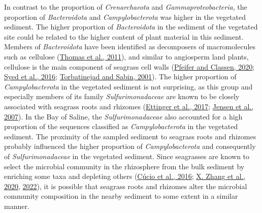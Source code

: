 \documentclass[
  12 pt,
]{book}
\begin{document}
In contrast to the proportion of \emph{Crenarchaeota} and \emph{Gammaproteobacteria}, the proportion of \emph{Bacteroidota} and \emph{Campylobacterota} was higher in the vegetated sediment. The higher proportion of \emph{Bacteroidota} in the sediment of the vegetated site could be related to the higher content of plant material in this sediment. Members of \emph{Bacteroidota} have been identified as decomposers of macromolecules such as cellulose (\protect\hyperlink{ref-Thomas2011}{Thomas et al., 2011}), and similar to angiosperm land plants, cellulose is the main component of seagrass cell walls (\protect\hyperlink{ref-Pfeifer2020}{Pfeifer and Classen, 2020}; \protect\hyperlink{ref-Syed2016}{Syed et al., 2016}; \protect\hyperlink{ref-Torbatinejad2001}{Torbatinejad and Sabin, 2001}). The higher proportion of \emph{Campylobacterota} in the vegetated sediment is not surprising, as this group and especially members of its family \emph{Sulfurimonadaceae} are known to be closely associated with seagrass roots and rhizomes (\protect\hyperlink{ref-Ettinger2017}{Ettinger et al., 2017}; \protect\hyperlink{ref-Jensen2007}{Jensen et al., 2007}). In the Bay of Saline, the \emph{Sulfurimonadaceae} also accounted for a high proportion of the sequences classified as \emph{Campylobacterota} in the vegetated sediment. The proximity of the sampled sediment to seagrass roots and rhizomes probably influenced the higher proportion of \emph{Campylobacterota} and consequently of \emph{Sulfurimonadaceae} in the vegetated sediment. Since seagrasses are known to select the microbial community in the rhizosphere from the bulk sediment by enriching some taxa and depleting others (\protect\hyperlink{ref-Cucio2016}{Cúcio et al., 2016}; \protect\hyperlink{ref-Zhang2020}{X. Zhang et al., 2020}, \protect\hyperlink{ref-Zhang2022}{2022}), it is possible that seagrass roots and rhizomes alter the microbial community composition in the nearby sediment to some extent in a similar manner.
\end{document}
